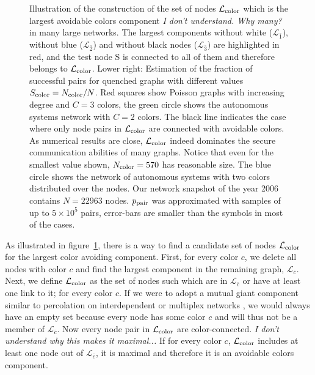 \documentclass[aps, pre, twocolumn, a4paper, superscriptaddress, floatfix]{revtex4}
\newcommand{\red}{\color{red}\footnotesize}
\begin{document}
\begin{figure}[htb]
\begin{center}
    \caption{Illustration of the construction of the  set of nodes $\mathcal{L}_{\rm color}$ which is the largest avoidable colors component {\red \textit{I don't understand.  Why many?} in many large networks. }
    The largest components without white ($\mathcal{L}_{\bar 1}$), without blue ($\mathcal{L}_{\bar 2}$) and without 
    black nodes ($\mathcal{L}_{\bar 3}$) are highlighted in red, and the test node S is connected to 
    all of them and therefore belongs to $\mathcal{L}_{\rm color}$. Lower right: Estimation of the fraction 
    of successful pairs for quenched graphs with different values $S_{\rm color}=N_{\rm color}/N$. 
    Red squares show Poisson graphs with increasing degree and $C=3$ colors, the green circle 
    shows the autonomous systems network with $C=2$ colors. The black line indicates the case 
    where only node pairs in $\mathcal{L}_{\rm color}$ are connected with avoidable colors. As numerical 
    results are close, $\mathcal{L}_{\rm color}$ indeed dominates the secure communication abilities of many
    graphs.
    Notice that even for the smallest value shown, $N_{\rm color}=570$ has reasonable size. The blue circle shows the network of autonomous systems with two colors distributed over the nodes. Our network 
snapshot of the year 2006 contains $N=22963$ nodes. $p_{\rm pair}$ was approximated with 
samples of up to $5\times 10^5$ pairs, error-bars are smaller than the symbols in most 
of the cases. 
    }
    \label{fig:avoidable_colors_candidate}
\end{center}
\end{figure}
%
As illustrated in figure~\ref{fig:avoidable_colors_candidate}, 
there is a way to find a candidate set of nodes $\mathcal{L}_{\rm color}$ 
for the largest color avoiding component.
First, for every color $c$, we delete all nodes with color $c$ 
and find the largest component in the remaining graph, $\mathcal{L}_{\bar c}$. 
Next, we define $\mathcal{L}_{\rm color}$ as the set of nodes such which are in $\mathcal{L}_{\bar c}$ or have at least one link to it; for every color $c$.
If we were to adopt a mutual giant component similar to percolation on interdependent\cite{buldyrev-nature2010} or multiplex networks \cite{baxter-prl2012}, we would always have an empty set because every node has some color $c$ and will thus not be a member of $\mathcal{L}_{\bar c}$. 
Now every node pair in $\mathcal{L}_{\rm color}$ are color-connected. 
{\red \textit{I don't understand why this makes it maximal...}
If for every color $c$, $\mathcal{L}_{\rm color}$ includes at least one node out of $\mathcal{L}_{\bar c}$, 
it is maximal and therefore it is an avoidable colors component. }
\end{document}
